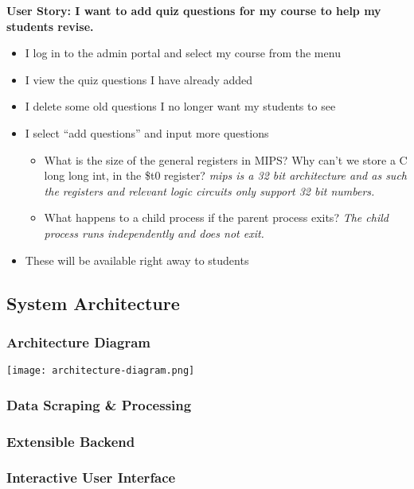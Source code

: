 \textbf{User Story: I want to add quiz questions for my course to help my students revise.}
\begin{itemize}
    \item{I log in to the admin portal and select my course from the menu}
    \item{I view the quiz questions I have already added}
    \item{I delete some old questions I no longer want my students to see}
    \item{I select “add questions” and input more questions}
    \begin{itemize}
        \item{What is the size of the general registers in MIPS? Why can’t we store a C long long int, in the \$t0 register? \textit{mips is a 32 bit architecture and as such the registers and relevant logic circuits only support 32 bit numbers.}}
        \item{What happens to a child process if the parent process exits? \textit{The child process runs independently and does not exit.}}
    \end{itemize}
    \item{These will be available right away to students}
\end{itemize}

\subsection{System Architecture}
\subsubsection{Architecture Diagram}
\texttt{[image: architecture-diagram.png]}

\subsubsection{Data Scraping \& Processing}

\subsubsection{Extensible Backend}


\subsubsection{Interactive User Interface}

\newpage
